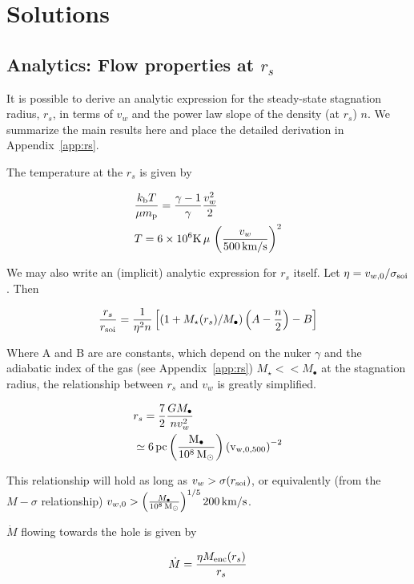 \documentclass[usenatbib,fleqn]{mn2e}
\newcommand{\Mdot}{\dot{M}}
\newcommand{\rs}{r_s}
\newcommand{\vw}{v_w}
\newcommand{\kew}{\frac{v_w^2}{2}}
\newcommand{\gammafi}{\frac{\gamma-1}{\gamma}}
\newcommand{\kb}{k_{\rm b}}
\renewcommand{\mp}{m_{\rm p}}
\newcommand{\pc}{\rm pc}
\newcommand{\Menc}{M_{\rm enc}}
\newcommand{\Mstar}{M_{\star}}
\newcommand{\Mbh}[1][]{M_{\bullet#1}}
\newcommand{\MbhNorm}{\frac{\Mbh}{10^8 \Msun}}
\newcommand{\soi}{\rm soi}
\newcommand{\rsoi}{r_{\soi}}
\newcommand{\vwO}{v_{w,0}}
\newcommand{\x}{\frac{r_s}{\rsoi}}
\newcommand{\vwOFH}{v_{w,0,500}}
\begin{document}
\section{Solutions}
\subsection{Analytics: Flow properties at $\rs$}
It is possible to derive an analytic expression for the steady-state stagnation radius, $\rs$, in terms of $v_w$ and the power law slope of the density (at $\rs$) $n$.   We summarize the main results here and place the detailed derivation in Appendix~\ref{app:rs}.

The temperature at the $\rs$ is given by

\begin{align}
 &\frac{\kb T}{\mu \mp}=\gammafi \kew \label{eq:tstag}\\
 &T=6 \times 10^6 {\rm K} \, \mu \, \left({\frac{\vw}{500 \,{\rm km/s}}}\right)^2 
\end{align}

We may also write an (implicit) analytic expression for $\rs$
itself. Let  $\eta=v_{w,0}/\sigma_{\rm soi}$. Then 

\begin{align}
\x=\frac{1}{\eta^2 n}\left[ (1+\Mstar(\rs)/\Mbh)\left(A-\frac{n}{2}\right)-B\right]
\label{eq:stag_analytic}
\end{align}

Where A and B are are constants, which depend on the nuker $\gamma$
and the adiabatic index of the gas (see Appendix~\ref{app:rs})  $\Mstar << \Mbh$ at the stagnation radius, the relationship between $\rs$ and $\vw$ is greatly simplified. 

\begin{align}
&\rs=\frac{7}{2}\frac{G \Mbh}{n \vw^2}\\
&\simeq 6 \, \pc \left(\MbhNorm\right) \left(\vwOFH\right)^{-2}
\label{eq:stag_simple}
\end{align}

This relationship will hold as long as $\vw > \sigma(\rsoi)$, or equivalently (from the $M-\sigma$ relationship) $\vwO > \left(\frac{\Mbh}{10^8 \Msun}\right)^{1/5} 200 {\rm \,  km/s}$.

$\Mdot$ flowing towards the hole is given by

\begin{align}
\dot{M}=\frac{\eta \Menc(\rs)}{\rs}
\end{align}
\end{document}
